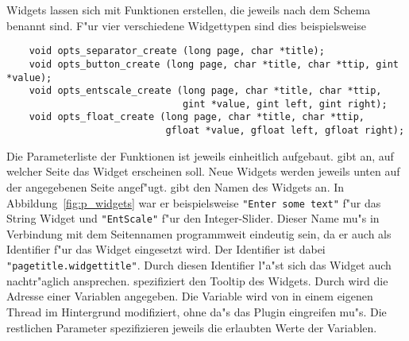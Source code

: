 Widgets lassen sich mit Funktionen erstellen, die jeweils nach dem
Schema  benannt sind. F"ur vier
verschiedene Widgettypen sind dies beispielsweise
\begin{small}
\linespread{0.9}
\begin{verbatim}
    void opts_separator_create (long page, char *title);
    void opts_button_create (long page, char *title, char *ttip, gint *value);
    void opts_entscale_create (long page, char *title, char *ttip,
                               gint *value, gint left, gint right);
    void opts_float_create (long page, char *title, char *ttip,
                            gfloat *value, gfloat left, gfloat right);
\end{verbatim}
\end{small}
Die Parameterliste der Funktionen ist jeweils einheitlich
aufgebaut.  gibt an, auf welcher Seite das Widget
erscheinen soll. Neue Widgets werden jeweils unten auf der
angegebenen Seite angef"ugt.  gibt den Namen des Widgets
an. In Abbildung~\ref{fig:p_widgets} war er beispielsweise
\verb|"Enter some text"| f"ur das String Widget und
\verb|"EntScale"| f"ur den Integer-Slider. Dieser Name mu"s in
Verbindung mit dem Seitennamen programmweit eindeutig sein, da er
auch als Identifier f"ur das Widget eingesetzt wird. Der Identifier
ist dabei \verb|"pagetitle.widgettitle"|. Durch diesen Identifier
l"a"st sich das Widget auch nachtr"aglich ansprechen. 
spezifiziert den Tooltip des Widgets. Durch  wird die
Adresse einer Variablen angegeben. Die Variable wird von \icewing{}
in einem eigenen Thread im Hintergrund modifiziert, ohne da"s das
Plugin eingreifen mu"s. Die restlichen Parameter spezifizieren
jeweils die erlaubten Werte der Variablen.

